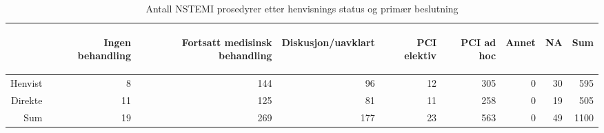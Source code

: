 \documentclass[presentation,xcolor=pdftex,dvipsnames,table]{beamer}
\begin{document}
\begin{frame}
\begin{tiny}
\begin{table}[ht]
\centering
\begin{tabular}{rrrrrrrrr}
  \toprule
 & \begin{sideways} Ingen behandling \end{sideways} & \begin{sideways} Fortsatt medisinsk behandling \end{sideways} & \begin{sideways} Diskusjon/uavklart \end{sideways} & \begin{sideways} PCI elektiv \end{sideways} & \begin{sideways} PCI ad hoc \end{sideways} & \begin{sideways} Annet \end{sideways} & \begin{sideways} NA \end{sideways} & \begin{sideways} Sum \end{sideways} \\ 
  \midrule
Henvist & 8 & 144 & 96 & 12 & 305 & 0 & 30 & 595 \\ 
  Direkte & 11 & 125 & 81 & 11 & 258 & 0 & 19 & 505 \\ 
  Sum & 19 & 269 & 177 & 23 & 563 & 0 & 49 & 1100 \\ 
   \bottomrule
\end{tabular}
\caption{Antall NSTEMI prosedyrer etter henvisnings status og primær beslutning} 
\end{table}\end{tiny}
\end{frame}
\end{document}
